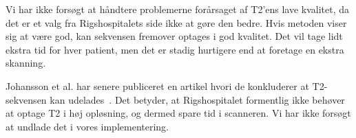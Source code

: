 Vi har ikke forsøgt at håndtere problemerne forårsaget af T2’ens lave kvalitet, da det er et valg fra Rigshospitalets side ikke at gøre den bedre. Hvis metoden viser sig at være god, kan sekvensen fremover optages i god kvalitet. Det vil tage lidt ekstra tid for hver patient, men det er stadig hurtigere end at foretage en ekstra skanning.

Johansson et al. har senere publiceret en artikel hvori de konkluderer at T2-sekvensen kan udelades~\cite{bettersCT}.  Det betyder, at Rigshospitalet formentlig ikke behøver at optage T2 i høj opløsning, og dermed spare tid i scanneren. Vi har ikke forsøgt at undlade det i vores implementering.
